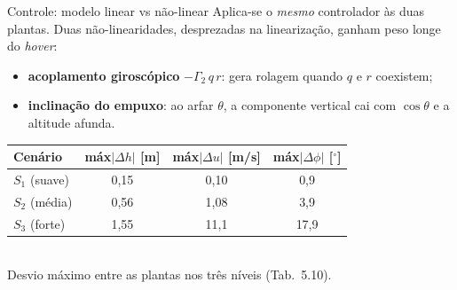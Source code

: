 \documentclass[aspectratio=169,11pt]{beamer}
\begin{document}
\begin{frame}{Controle: modelo linear vs não-linear}
  Aplica-se o \emph{mesmo} controlador às duas plantas. Duas não-linearidades, desprezadas na linearização, ganham peso longe do \textit{hover}:
  \begin{itemize}\footnotesize
    \item \textbf{acoplamento giroscópico} $-\Gamma_2\,q\,r$: gera rolagem quando $q$ e $r$ coexistem;
    \item \textbf{inclinação do empuxo}: ao arfar $\theta$, a componente vertical cai com $\cos\theta$ e a altitude afunda.
  \end{itemize}
  \begin{center}
  {\footnotesize
  \begin{tabular}{l ccc}
    \toprule
    Cenário & máx$|\Delta h|$ [m] & máx$|\Delta u|$ [m/s] & máx$|\Delta\phi|$ [$^\circ$] \\
    \midrule
    $S_1$ (suave) & 0,15 & 0,10 & 0,9 \\
    $S_2$ (média) & 0,56 & 1,08 & 3,9 \\
    $S_3$ (forte) & 1,55 & 11,1 & 17,9 \\
    \bottomrule
  \end{tabular}}\\[0.2em]
  {\footnotesize Desvio máximo entre as plantas nos três níveis (Tab.~5.10).}
  \end{center}
\end{frame}
\end{document}
